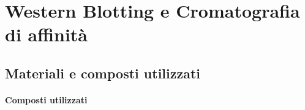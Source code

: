 \section{Western Blotting e Cromatografia di affinità}

\subsection{Materiali e composti utilizzati}

\paragraph{Composti utilizzati}
\begingroup
{}
